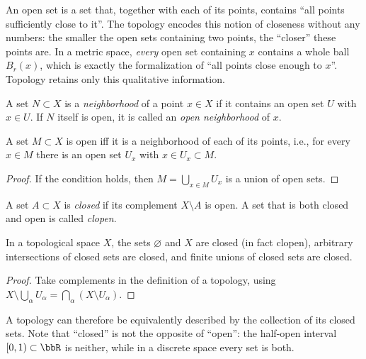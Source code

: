 \begin{intu*}
    An open set is a set that, together with each of its points, contains ``all points sufficiently close to it''. The topology encodes this notion of closeness without any numbers: the smaller the open sets containing two points, the ``closer'' these points are. In a metric space, \emph{every} open set containing $x$ contains a whole ball $B_r(x)$, which is exactly the formalization of ``all points close enough to $x$''. Topology retains only this qualitative information.
\end{intu*}

\begin{defn}[Neighborhood]
    A set $N\subset X$ is a \emph{neighborhood} of a point $x\in X$ if it contains an open set $U$ with $x\in U$. If $N$ itself is open, it is called an \emph{open neighborhood} of $x$.
\end{defn}

\begin{prop}\label{open iff contains neighborhoods}
    A set $M\subset X$ is open iff it is a neighborhood of each of its points, i.e., for every $x\in M$ there is an open set $U_x$ with $x\in U_x\subset M$.
\end{prop}
\begin{proof}
    If the condition holds, then $M=\bigcup_{x\in M}U_x$ is a union of open sets.
\end{proof}

\begin{defn}
    A set $A\subset X$ is \emph{closed} if its complement $X\setminus A$ is open. A set that is both closed and open is called \emph{clopen}.
\end{defn}

\begin{prop}\label{prop closed sets}
    In a topological space $X$, the sets $\varnothing$ and $X$ are closed (in fact clopen), arbitrary intersections of closed sets are closed, and finite unions of closed sets are closed.
\end{prop}
\begin{proof}
    Take complements in the definition of a topology, using $X\setminus\bigcup_\alpha U_\alpha=\bigcap_\alpha(X\setminus U_\alpha)$.
\end{proof}

A topology can therefore be equivalently described by the collection of its closed sets. Note that ``closed'' is not the opposite of ``open'': the half-open interval $[0,1)\subset\bbR$ is neither, while in a discrete space every set is both.

